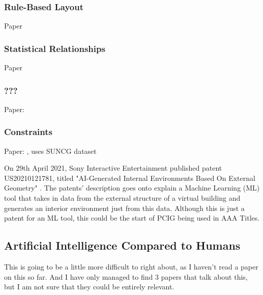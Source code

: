 \subsubsection*{Rule-Based Layout}
Paper \cite{rule-based-layout}
\subsubsection*{Statistical Relationships}
Paper \cite{make-it-home}
\subsubsection*{???}
Paper: \cite{pcig-for-ai-and-cg}
\subsubsection*{Constraints}
Paper: \cite{constrained-layouts}, uses SUNCG dataset \cite{suncg}

\bigskip
On 29th April 2021, Sony Interactive Entertainment published patent US20210121781, 
titled "AI-Generated Internal Environments Based On External Geometry" \cite{sony-patent}.
The patents' description goes onto explain a 
Machine Learning (ML) tool that takes in data from the external structure of a virtual building
and generates an interior environment just from this data.
Although this is just a patent for an ML tool, this could be the start of PCIG being used in AAA Titles. 

\subsection{Artificial Intelligence Compared to Humans}
This is going to be a little more difficult to right about, as I haven't read a paper on this so far.
And I have only managed to find 3 papers that talk about this, but I am not sure that they could be entirely relevant.